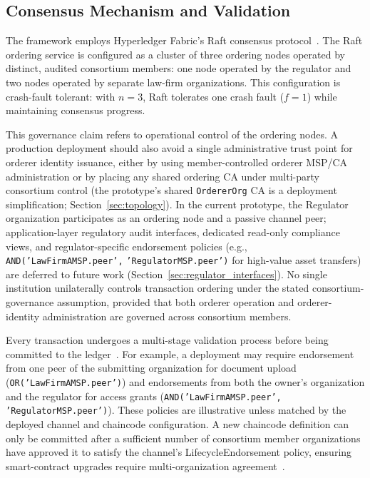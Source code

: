 \documentclass[preprint,12pt]{elsarticle}
\begin{document}
\subsection{Consensus Mechanism and Validation}
\label{sec:consensus}

The framework employs Hyperledger Fabric's Raft consensus
protocol~\cite{Ongaro2014,hyperledgerFabricOrderingService_v24}.
The Raft ordering service is configured as a cluster of three ordering nodes
operated by distinct, audited consortium members: one node operated by the
regulator and two nodes operated by separate law-firm organizations. This
configuration is crash-fault tolerant: with $n=3$, Raft tolerates one crash
fault ($f=1$) while maintaining consensus progress.

This governance claim
refers to operational control of the ordering nodes. A production deployment
should also avoid a single administrative trust point for orderer identity
issuance, either by using member-controlled orderer MSP/CA administration or
by placing any shared ordering CA under multi-party consortium control
(the prototype's shared \texttt{OrdererOrg} CA is a deployment
simplification; Section~\ref{sec:topology}). In the current prototype, the Regulator organization participates as an ordering node and a passive channel peer; application-layer regulatory audit interfaces, dedicated read-only compliance views, and regulator-specific endorsement
policies (e.g., \texttt{AND(}\allowbreak\texttt{'LawFirmAMSP.peer',}\allowbreak
\texttt{'RegulatorMSP.peer')} for high-value asset transfers) are deferred to future work (Section~\ref{sec:regulator_interfaces}). No single institution unilaterally controls transaction ordering under
the stated consortium-governance assumption, provided that both orderer
operation and orderer-identity administration are governed across consortium
members.

Every transaction undergoes a multi-stage validation process before
being committed to the
ledger~\cite{androulaki2018hyperledger,fabricEndorsementDoc}. For
example, a deployment may require endorsement from one peer of the
submitting organization for document upload
(\texttt{OR('LawFirmAMSP.peer')}) and endorsements from both the
owner's organization and the regulator for access grants
(\texttt{AND('LawFirmAMSP.peer', 'RegulatorMSP.peer')}). These
policies are illustrative unless matched by the deployed channel and
chaincode configuration. A new chaincode definition can only be
committed after a sufficient number of consortium member organizations
have approved it to satisfy the channel's LifecycleEndorsement policy,
ensuring smart-contract upgrades require multi-organization
agreement~\cite{fabricChaincodeLifecycleDoc}.
\newpage
\end{document}
